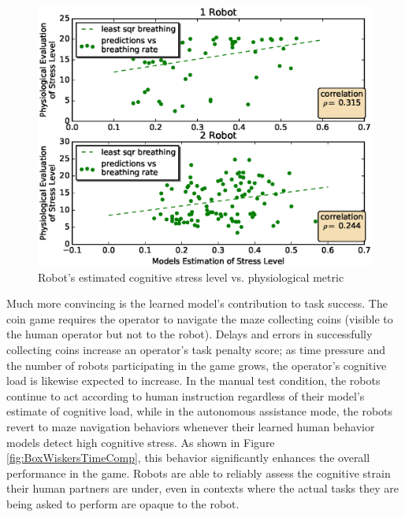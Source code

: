 \documentclass{sig-alternate}
\begin{document}

\begin{figure}  
\centering
\includegraphics[width=.5\textwidth]{prediction_vs_b_p_2.eps}
\caption{Robot's estimated cognitive stress level vs. physiological metric}
\label{fig:pred_phy}
\end{figure}

Much more convincing is the learned model's contribution to task
success.  The coin game requires the operator to navigate the maze collecting coins (visible to the human operator but not to the robot).  Delays and errors in successfully collecting coins increase an operator's task penalty score; as time pressure and the number of robots participating in the game grows, the operator's cognitive load is likewise expected to increase.  In the manual test condition, the robots continue to act according to human instruction regardless of their model's estimate of cognitive load, while in the autonomous assistance mode, the robots revert to maze navigation behaviors whenever their learned human behavior models detect high cognitive stress.  As shown in Figure \ref{fig:BoxWiskersTimeComp}, this behavior significantly enhances the overall performance in the game.  Robots are able to reliably assess the cognitive strain their human partners are under, even in contexts where the actual tasks they are being asked to perform are opaque to the robot.
\end{document}

